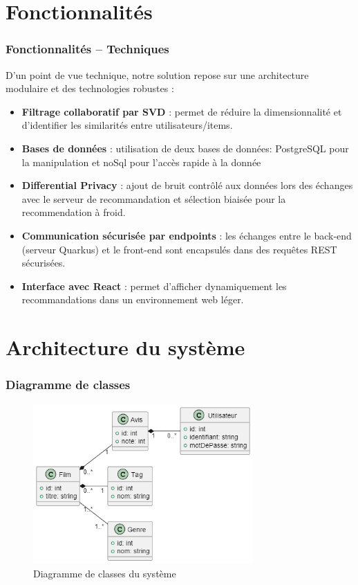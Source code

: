 \documentclass{beamer}
\begin{document}
\section{Fonctionnalités}
\begin{frame}
    \frametitle{Fonctionnalités – Techniques}
    \small
    D’un point de vue technique, notre solution repose sur une architecture modulaire et des technologies robustes :

    \begin{itemize}
        \item \textbf{Filtrage collaboratif par SVD} : permet de réduire la dimensionnalité et d’identifier les similarités entre utilisateurs/items.
        \item \textbf{Bases de données} : utilisation de deux bases de données: PostgreSQL pour la manipulation et noSql pour l'accès rapide à la donnée
        \item \textbf{Differential Privacy} : ajout de bruit contrôlé aux données lors des échanges avec le serveur de recommandation et sélection biaisée pour la recommendation à froid.
        \item \textbf{Communication sécurisée par endpoints} : les échanges entre le back-end (serveur Quarkus) et le front-end sont encapsulés dans des requêtes REST sécurisées.
        \item \textbf{Interface avec React} : permet d’afficher dynamiquement les recommandations dans un environnement web léger.
    \end{itemize}

\end{frame}

\section{Architecture du système}
\begin{frame}
    \frametitle{Diagramme de classes}
    \vspace{0.5cm}
    \begin{figure}
        \centering
        \includegraphics[width=0.75\textwidth]{classe.png}
        \caption{\small Diagramme de classes du système}
    \end{figure}
\end{frame}
\end{document}
